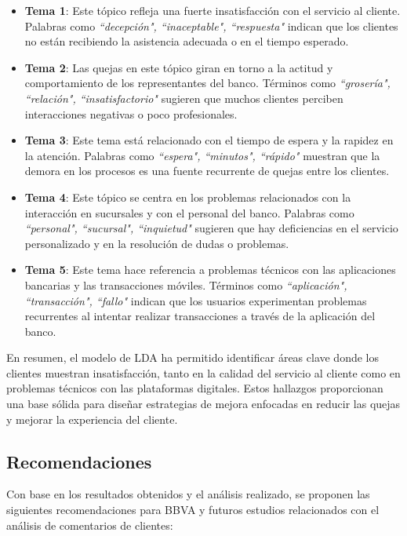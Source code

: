 \documentclass{matematicasud}
\begin{document}
\begin{itemize}
    \item \textbf{Tema 1}: Este tópico refleja una fuerte insatisfacción con el servicio al cliente. Palabras como \textit{``decepción", ``inaceptable", ``respuesta"} indican que los clientes no están recibiendo la asistencia adecuada o en el tiempo esperado.
    
    \item \textbf{Tema 2}: Las quejas en este tópico giran en torno a la actitud y comportamiento de los representantes del banco. Términos como \textit{``grosería", ``relación", ``insatisfactorio"} sugieren que muchos clientes perciben interacciones negativas o poco profesionales.
    
    \item \textbf{Tema 3}: Este tema está relacionado con el tiempo de espera y la rapidez en la atención. Palabras como \textit{``espera", ``minutos", ``rápido"} muestran que la demora en los procesos es una fuente recurrente de quejas entre los clientes.
    
    \item \textbf{Tema 4}: Este tópico se centra en los problemas relacionados con la interacción en sucursales y con el personal del banco. Palabras como \textit{``personal", ``sucursal", ``inquietud"} sugieren que hay deficiencias en el servicio personalizado y en la resolución de dudas o problemas.
    
    \item \textbf{Tema 5}: Este tema hace referencia a problemas técnicos con las aplicaciones bancarias y las transacciones móviles. Términos como \textit{``aplicación", ``transacción", ``fallo"} indican que los usuarios experimentan problemas recurrentes al intentar realizar transacciones a través de la aplicación del banco.
\end{itemize}

En resumen, el modelo de LDA ha permitido identificar áreas clave donde los clientes muestran insatisfacción, tanto en la calidad del servicio al cliente como en problemas técnicos con las plataformas digitales. Estos hallazgos proporcionan una base sólida para diseñar estrategias de mejora enfocadas en reducir las quejas y mejorar la experiencia del cliente.

\subsection{Recomendaciones}

Con base en los resultados obtenidos y el análisis realizado, se proponen las siguientes recomendaciones para BBVA y futuros estudios relacionados con el análisis de comentarios de clientes:
\end{document}
